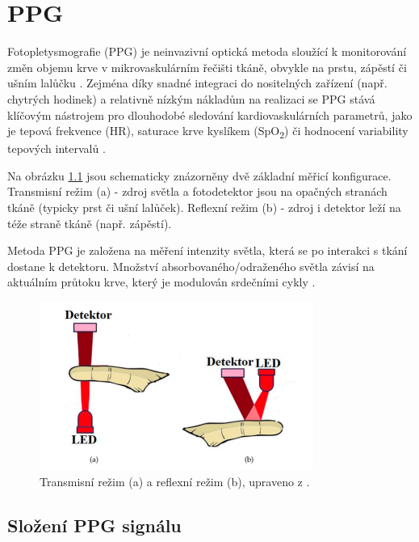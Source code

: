\chapter{\acl{PPG}}
\label{chap:PPG_teorie}

Fotopletysmografie (\acs{PPG}) je neinvazivní optická metoda sloužící k monitorování změn objemu krve v mikrovaskulárním řečišti tkáně, obvykle na prstu, zápěstí či ušním lalůčku \cite{Park2022}.
Zejména díky snadné integraci do nositelných zařízení (např. chytrých hodinek) a relativně nízkým nákladům na realizaci se \acs{PPG} stává klíčovým nástrojem pro dlouhodobé sledování kardiovaskulárních parametrů,
jako je tepová frekvence (HR), saturace krve kyslíkem (SpO\textsubscript{2}) či hodnocení variability tepových intervalů \cite{Orphanidou2018}.

Na obrázku \ref{fig:snimaniPPG} jsou schematicky znázorněny dvě základní měřicí konfigurace.
Transmisní režim (a) - zdroj světla a fotodetektor jsou na opačných stranách tkáně (typicky prst či ušní lalůček).
Reflexní režim (b) - zdroj i detektor leží na téže straně tkáně (např. zápěstí).

Metoda \acs{PPG} je založena na měření intenzity světla, která se po interakci s tkání dostane k detektoru.
Množství absorbovaného/odraženého světla závisí na aktuálním průtoku krve, který je modulován srdečními cykly \cite{Park2022}.

\begin{figure}[h]
	\centering
	\includegraphics[width=0.8\textwidth]{./obrazky/snimaniPPG.png}
	\caption[Snímání PPG signálu]{Transmisní režim (a) a reflexní režim (b), upraveno z \cite{ENIKÖ}.}
	\label{fig:snimaniPPG}
\end{figure}

\section{Složení \acs{PPG} signálu}

